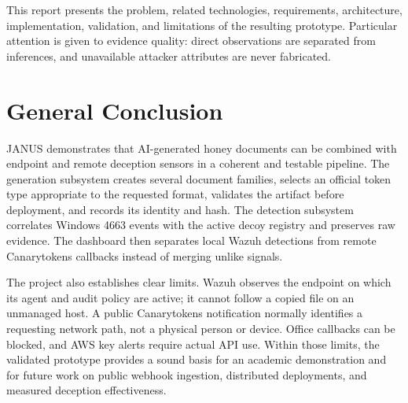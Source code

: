 \documentclass{rapportENSIAS}
\begin{document}
This report presents the problem, related technologies, requirements,
architecture, implementation, validation, and limitations of the resulting
prototype. Particular attention is given to evidence quality: direct
observations are separated from inferences, and unavailable attacker
attributes are never fabricated.







\chapter*{General Conclusion}
JANUS demonstrates that AI-generated honey documents can be combined with
endpoint and remote deception sensors in a coherent and testable pipeline. The
generation subsystem creates several document families, selects an official
token type appropriate to the requested format, validates the artifact before
deployment, and records its identity and hash. The detection subsystem
correlates Windows 4663 events with the active decoy registry and preserves raw
evidence. The dashboard then separates local Wazuh detections from remote
Canarytokens callbacks instead of merging unlike signals.

The project also establishes clear limits. Wazuh observes the endpoint on
which its agent and audit policy are active; it cannot follow a copied file on
an unmanaged host. A public Canarytokens notification normally identifies a
requesting network path, not a physical person or device. Office callbacks can
be blocked, and AWS key alerts require actual API use. Within those limits, the
validated prototype provides a sound basis for an academic demonstration and
for future work on public webhook ingestion, distributed deployments, and
measured deception effectiveness.




\appendix
\end{document}
